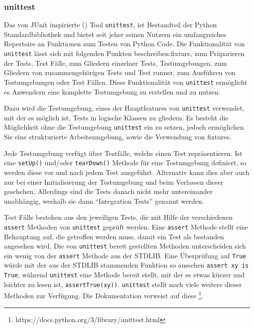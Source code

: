 \subsubsection{unittest}\label{python-tools:unittest}

Das von JUnit inspirierte (\cite{docs.python:unittest}) Tool
\lstinline{unittest}, ist Bestandteil der Python Standardbibliothek und bietet
seit jeher seinen Nutzern ein umfangreiches Repertoire an Funktionen zum Testen
von Python Code.
\noindent
Die Funktionalität von \lstinline{unittest} lässt sich mit folgenden Punkten
beschreiben:\Gls{fixture}, zum Präparieren der Tests, Test Fälle, zum Gliedern
einzelner Tests, Testumgebungen, zum Gliedern von zusammengehörigen Tests und
Test runner, zum Ausführen von Testumgebungen oder Test Fällen.
Diese Funktionalität von \lstinline{unittest} ermöglicht es Anwendern eine
komplette Testumgebung zu erstellen und zu nutzen.

Dazu wird die Testumgebung, eines der Hauptfeatures von \lstinline{unittest}
verwendet, mit der es möglich ist, Tests in logische Klassen zu gliedern. Es
besteht die Möglichkeit ohne die Testumgebung \lstinline{unittest} ein zu
setzen, jedoch ermöglichen Sie eine strukturierte Arbeitsumgebung, sowie die
Verwendung von \Glspl{fixture}.

Jede Testumgebung verfügt über Testfälle, welche einen Test repräsentieren.
Ist eine \lstinline{setUp()} und/oder \lstinline{tearDown()} Methode für eine
Testumgebung definiert, so werden diese vor und nach jedem Test ausgeführt.
Alternativ kann dies aber auch nur bei einer Initialisierung der Testumgebung
und beim Verlassen dieser geschehen. Allerdings sind die Tests danach nicht
mehr untereinander unabhängig, weshalb sie dann "`Integration Tests"' genannt
werden.

Test Fälle bestehen aus den jeweiligen Tests, die mit Hilfe der verschiedenen
\lstinline{assert} Methoden von \lstinline{unittest} geprüft werden. Eine
\lstinline{assert} Methode stellt eine Behauptung auf, die getroffen werden
muss, damit ein Test als bestanden angesehen wird. Die von \lstinline{unittest}
bereit gestellten Methoden unterscheiden sich ein wenig von der
\lstinline{assert} Methode aus der STDLIB. Eine Überprüfung auf
\lstinline{True} würde mit der aus der STDLIB stammenden Funktion so aussehen
\lstinline{assert xy is True}, während \lstinline{unittest} eine Methode bereit
stellt, mit der es etwas kürzer und leichter zu lesen ist,
\lstinline{assertTrue(xy))}. \lstinline{unittest} stellt noch viele weitere
dieser Methoden zur Verfügung. Die Dokumentation verweist auf diese
\footnote{https://docs.python.org/3/library/unittest.html}.

